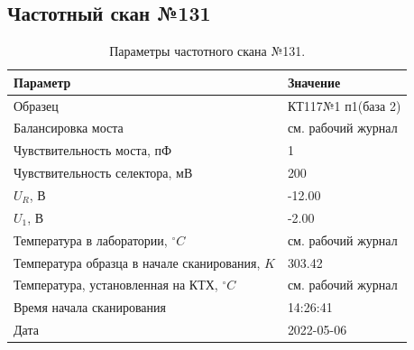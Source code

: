 \subsection{Частотный скан №131}
\begin{table}[!ht]
    \centering
    \caption{Параметры частотного скана №131.}
    \begin{tabular}{|l|l|}
        \hline
        Параметр                                       & Значение                  \\ \hline
        Образец                                        & КТ117№1 п1(база 2)        \\ \hline
        Балансировка моста                             & см. рабочий журнал        \\ \hline
        Чувствительность моста, пФ                     & 1                         \\ \hline
        Чувствительность селектора, мВ                 & 200                       \\ \hline
        $U_R$, В                                       & -12.00                    \\ \hline
        $U_1$, В                                       & -2.00                     \\ \hline
        Температура в лаборатории, $^\circ C$          & см. рабочий журнал        \\ \hline
        Температура образца в начале сканирования, $K$ & 303.42                    \\ \hline
        Температура, установленная на КТХ, $^\circ C$  & см. рабочий журнал        \\ \hline
        Время начала сканирования                      & 14:26:41                  \\ \hline
        Дата                                           & 2022-05-06                \\ \hline
    \end{tabular}
    \label{table:frequency_scan_131}
\end{table}

